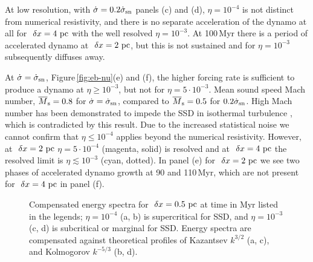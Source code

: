 \documentclass[preprint2]{aastex63}
\newcommand\SNr{\dot\sigma_{\rm sn}}
\newcommand\Ms{M_{\rm s}}
\newcommand\pc{~ {\rm pc}}
\newcommand\dx{~ {\delta x}}
\begin{document}
At low resolution, with $\dot\sigma=0.2\SNr$ panels (c) and (d), $\eta=10^{-4}$
is not distinct from numerical resistivity, and there is no separate
acceleration of the dynamo at all for $\dx=4\pc$ with the well resolved
$\eta=10^{-3}$.
At 100\,Myr there is a period of accelerated dynamo at $\dx=2\pc$, but this is
not sustained and for $\eta=10^{-3}$ subsequently diffuses away.

At $\dot\sigma=\SNr$, Figure\,\ref{fig:eb-nu}(e) and (f), the 
higher forcing rate is sufficient to produce a dynamo at $\eta\geq10^{-3}$, but
not for $\eta=5\cdot10^{-3}$.
Mean sound speed Mach number, $\overline\Ms=0.8$ for $\dot\sigma=\SNr$,
compared to $\overline\Ms=0.5$ for $0.2\SNr$.
High Mach number has been demonstrated to impede the SSD in isothermal 
turbulence \citep{Haugen:2004M}, which is contradicted by this result.
%
Due to the increased statistical noise we cannot confirm that $\eta\leq10^{-4}$
applies beyond the numerical resistivity.
However, at $\dx=2\pc$ $\eta=5\cdot10^{-4}$ (magenta, solid) is resolved and
at $\dx=4\pc$ the resolved limit is $\eta\lesssim10^{-3}$ (cyan, dotted).
In panel (e) for $\dx=2\pc$ we see two phases of accelerated dynamo growth at
90 and 110\,Myr, which are not present for $\dx=4\pc$ in panel (f).

\begin{figure*}
\caption{
Compensated energy spectra for $\dx=0.5\pc$ at time in Myr listed in the
legends; $\eta=10^{-4}$ (a, b) is supercritical for SSD, and $\eta=10^{-3}$ (c, d) 
is subcritical or marginal for SSD.
Energy spectra are compensated against theoretical profiles of Kazantsev
$k^{3/2}$ (a, c), and Kolmogorov $k^{-5/3}$ (b, d).
\label{fig:4power}}
\end{figure*}
\end{document}
